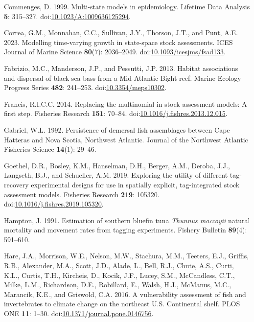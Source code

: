 \documentclass[
]{article}
\newlength{\cslhangindent}
\newlength{\cslentryspacingunit} %
\newenvironment{CSLReferences}[2] %
 {%
  \setlength{\parindent}{0pt}
  \ifodd #1
  \let\oldpar\par
  \def\par{\hangindent=\cslhangindent\oldpar}
  \fi
  \setlength{\parskip}{#2\cslentryspacingunit}
 }%
 {}
\begin{document}
\begin{CSLReferences}{1}{0}
\leavevmode{}%
Commenges, D. 1999. Multi-state models in epidemiology. Lifetime Data Analysis \textbf{5}: 315--327. doi:\href{https://doi.org/10.1023/A:1009636125294}{10.1023/A:1009636125294}.

\leavevmode{}%
Correa, G.M., Monnahan, C.C., Sullivan, J.Y., Thorson, J.T., and Punt, A.E. 2023. Modelling time-varying growth in state-space stock assessments. ICES Journal of Marine Science \textbf{80}(7): 2036--2049. doi:\href{https://doi.org/10.1093/icesjms/fsad133}{10.1093/icesjms/fsad133}.

\leavevmode{}%
Fabrizio, M.C., Manderson, J.P., and Pessutti, J.P. 2013. Habitat associations and dispersal of black sea bass from a {M}id-{A}tlantic {B}ight reef. Marine Ecology Progress Series \textbf{482}: 241--253. doi:\href{https://doi.org/10.3354/meps10302}{10.3354/meps10302}.

\leavevmode{}%
Francis, R.I.C.C. 2014. Replacing the multinomial in stock assessment models: A first step. Fisheries Research \textbf{151}: 70--84. doi:\href{https://doi.org/10.1016/j.fishres.2013.12.015}{10.1016/j.fishres.2013.12.015}.

\leavevmode{}%
Gabriel, W.L. 1992. Persistence of demersal fish assemblages between {C}ape {H}atteras and {N}ova {S}cotia, {N}orthwest {A}tlantic. Journal of the Northwest Atlantic Fisheries Science \textbf{14}(1): 29--46.

\leavevmode{}%
Goethel, D.R., Bosley, K.M., Hanselman, D.H., Berger, A.M., Deroba, J.J., Langseth, B.J., and Schueller, A.M. 2019. Exploring the utility of different tag-recovery experimental designs for use in spatially explicit, tag-integrated stock assessment models. Fisheries Research \textbf{219}: 105320. doi:\href{https://doi.org/10.1016/j.fishres.2019.105320}{10.1016/j.fishres.2019.105320}.

\leavevmode{}%
Hampton, J. 1991. Estimation of southern bluefin tuna \emph{{T}hunnus maccoyii} natural mortality and movement rates from tagging experiments. Fishery Bulletin \textbf{89}(4): 591--610.

\leavevmode{}%
Hare, J.A., Morrison, W.E., Nelson, M.W., Stachura, M.M., Teeters, E.J., Griffis, R.B., Alexander, M.A., Scott, J.D., Alade, L., Bell, R.J., Chute, A.S., Curti, K.L., Curtis, T.H., Kircheis, D., Kocik, J.F., Lucey, S.M., McCandless, C.T., Milke, L.M., Richardson, D.E., Robillard, E., Walsh, H.J., McManus, M.C., Marancik, K.E., and Griswold, C.A. 2016. A vulnerability assessment of fish and invertebrates to climate change on the northeast {U}.{S}. Continental shelf. PLOS ONE \textbf{11}: 1--30. doi:\href{https://doi.org/10.1371/journal.pone.0146756}{10.1371/journal.pone.0146756}.


\end{CSLReferences}
\end{document}
